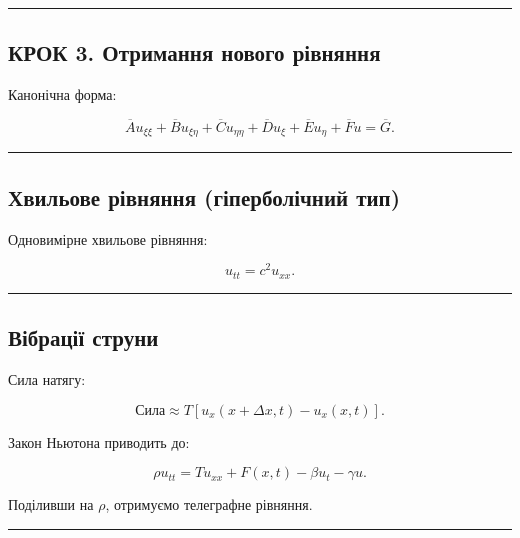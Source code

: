 \documentclass[
  ukrainian,
]{article}
\begin{document}
\begin{center}\rule{0.5\linewidth}{0.5pt}\end{center}

\subsection{КРОК 3. Отримання нового
рівняння}\label{ux43aux440ux43eux43a-3.-ux43eux442ux440ux438ux43cux430ux43dux43dux44f-ux43dux43eux432ux43eux433ux43e-ux440ux456ux432ux43dux44fux43dux43dux44f}

Канонічна форма:

\[
\overline{A}u_{\xi\xi} + \overline{B}u_{\xi\eta} + \overline{C}u_{\eta\eta} + \overline{D}u_{\xi} + \overline{E}u_{\eta} + \overline{F}u = \overline{G}.
\]

\begin{center}\rule{0.5\linewidth}{0.5pt}\end{center}

\subsection{Хвильове рівняння (гіперболічний
тип)}\label{ux445ux432ux438ux43bux44cux43eux432ux435-ux440ux456ux432ux43dux44fux43dux43dux44f-ux433ux456ux43fux435ux440ux431ux43eux43bux456ux447ux43dux438ux439-ux442ux438ux43f}

Одновимірне хвильове рівняння:

\[
u_{tt} = c^2 u_{xx}.
\]

\begin{center}\rule{0.5\linewidth}{0.5pt}\end{center}

\subsection{Вібрації
струни}\label{ux432ux456ux431ux440ux430ux446ux456ux457-ux441ux442ux440ux443ux43dux438}

Сила натягу:

\[
\text{Сила} \approx T \left[ u_x(x + \Delta x, t) - u_x(x, t) \right].
\]

Закон Ньютона приводить до:

\[
\rho u_{tt} = T u_{xx} + F(x,t) - \beta u_t - \gamma u.
\]

Поділивши на \(\rho\), отримуємо телеграфне рівняння.

\begin{center}\rule{0.5\linewidth}{0.5pt}\end{center}
\end{document}
